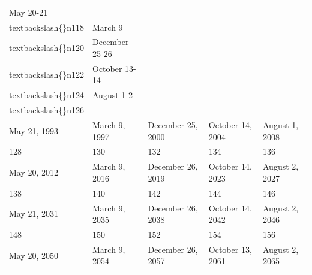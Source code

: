 \documentclass{article}
\begin{document}
\begin{tabular}{lllll}
\toprule
May 20-21\\textbackslash\{\}n118 & March 9\\textbackslash\{\}n120 & December 25-26\\textbackslash\{\}n122 & October 13-14\\textbackslash\{\}n124 & August 1-2\\textbackslash\{\}n126 \\
\midrule
May 21, 1993 & March 9, 1997 & December 25, 2000 & October 14, 2004 & August 1, 2008 \\
128 & 130 & 132 & 134 & 136 \\
May 20, 2012 & March 9, 2016 & December 26, 2019 & October 14, 2023 & August 2, 2027 \\
138 & 140 & 142 & 144 & 146 \\
May 21, 2031 & March 9, 2035 & December 26, 2038 & October 14, 2042 & August 2, 2046 \\
148 & 150 & 152 & 154 & 156 \\
May 20, 2050 & March 9, 2054 & December 26, 2057 & October 13, 2061 & August 2, 2065 \\
\bottomrule
\end{tabular}
\end{document}
